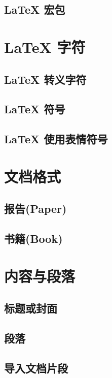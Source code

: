 \documentclass[cn,10pt,math=newtx,citestyle=gb7714-2015,bibstyle=gb7714-2015]{elegantbook}
\begin{document}
    \subsection{\LaTeX{} 宏包}
    
    \section{\LaTeX{} 字符}

    \subsection{\LaTeX{} 转义字符}

    \subsection{\LaTeX{} 符号}

    \subsection{\LaTeX{} 使用表情符号}

    \section {文档格式}

    \subsection {报告(Paper)}

    \subsection {书籍(Book)}

    \section {内容与段落}

    \subsection {标题或封面}

    \subsection {段落}

    \subsection {导入文档片段}
\end{document}
